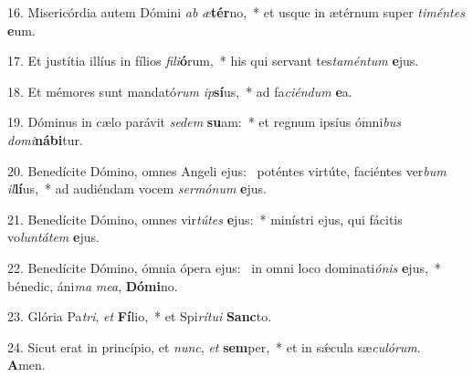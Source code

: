 16. Misericórdia autem Dómini \textit{ab} \textit{æ}\textbf{tér}no,~*  et usque in ætérnum super \textit{ti}\textit{mén}\textit{tes} \textbf{e}um.\

17. Et justítia illíus in fílios \textit{fi}\textit{li}\textbf{ó}rum,~*  his qui servant tes\textit{ta}\textit{mén}\textit{tum} \textbf{e}jus.\

18. Et mémores sunt mandató\textit{rum} \textit{ip}\textbf{sí}us,~*  ad fa\textit{ci}\textit{én}\textit{dum} \textbf{e}a.\

19. Dóminus in cælo parávit \textit{se}\textit{dem} \textbf{su}am:~*  et regnum ipsíus ómni\textit{bus} \textit{do}\textit{mi}\textbf{ná}\textbf{bi}tur.\

20. Benedícite Dómino, omnes Angeli ejus: \dag\  poténtes virtúte, faciéntes ver\textit{bum} \textit{il}\textbf{lí}us,~*  ad audiéndam vocem \textit{ser}\textit{mó}\textit{num} \textbf{e}jus.\

21. Benedícite Dómino, omnes vir\textit{tú}\textit{tes} \textbf{e}jus:~*  minístri ejus, qui fácitis vo\textit{lun}\textit{tá}\textit{tem} \textbf{e}jus.\

22. Benedícite Dómino, ómnia ópera ejus: \dag\  in omni loco dominati\textit{ó}\textit{nis} \textbf{e}jus,~*  bénedic, áni\textit{ma} \textit{me}\textit{a}, \textbf{Dó}\textbf{mi}no.\

23. Glória Pa\textit{tri}, \textit{et} \textbf{Fí}lio,~*  et Spi\textit{rí}\textit{tu}\textit{i} \textbf{Sanc}to.\

24. Sicut erat in princípio, et \textit{nunc}, \textit{et} \textbf{sem}per,~*  et in sǽcula sæ\textit{cu}\textit{ló}\textit{rum}. \textbf{A}men.\

